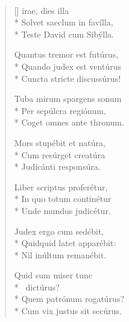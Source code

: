 \newHymn
\JustHymnNum\par\vskip-10pt

\ 

\smallskip

\pointtrans
{}

\settowidth{\versewidth}{Solvet saeclum in favílla,}
\begin{multicols}{2}
\begin{flushleft}
\begin{verse}[\versewidth]
{} irae, dies illa\\*
Solvet saeclum in favílla,   \\*   
Teste David cum Sibýlla.        
                                
Quantus tremor est futúrus,    \\* 
Quando judex est ventúrus       \\*
Cuncta stricte discussúrus!     

Tuba mirum spargens sonum       \\*
Per sepúlcra regiónum,          \\*
Coget omnes ante thronum.       
                                
Mors stupébit et natúra,        \\*
Cum resúrget creatúra           \\*
Judicánti responsúra.           
                                
Liber scriptus proferétur,      \\*
In quo totum continétur         \\*
Unde mundus judicétur.          
                                
                                
Judex ergo cum sedébit,         \\*
Quidquid latet apparébit:       \\*
Nil inúltum remanébit.          
                                
                                
                                
                                
                                
                                
Quid sum miser tunc\\*
\ \qquad dictúrus?   \\*
Quem patrónum rogatúrus?        \\*
Cum vix justus sit secúrus.     
                                

\end{verse}
\end{flushleft}
\end{multicols}
